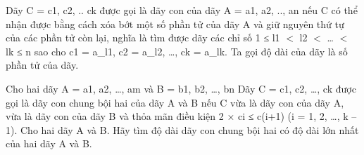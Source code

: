 Dãy C = c1, c2, .. ck được gọi là dãy con của dãy A = a1, a2, .., an nếu C có thể nhận được bằng cách xóa bớt một số phần tử của dãy A và giữ nguyên thứ tự của các phần tử còn lại, nghĩa là tìm được dãy các chỉ số 1 ≤ l1 $<$ l2 $<$ … $<$ lk ≤ n sao cho c1 = a\_l1, c2 = a\_l2, …, ck = a\_lk. Ta gọi độ dài của dãy là số phần tử của dãy.

Cho hai dãy A = a1, a2, …, am và B = b1, b2, …, bn Dãy C = c1, c2, …, ck được gọi là dãy con chung bội hai của dãy A và B nếu C vừa là dãy con của dãy A, vừa là dãy con của dãy B và thỏa mãn điều kiện 2 × ci ≤ c(i+1) (i = 1, 2, …, k – 1).
Cho hai dãy A và B. Hãy tìm độ dài dãy con chung bội hai có độ dài lớn nhất của hai dãy A và B.